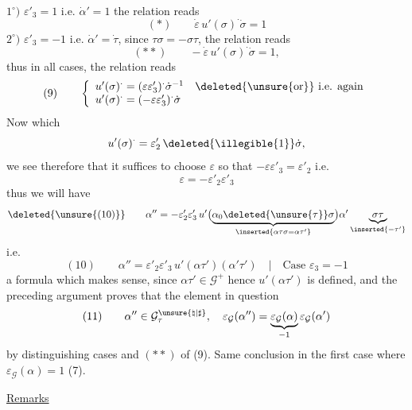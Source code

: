 $1^\circ)$ \quad $\varepsilon'_3=1$ i.e. $\dot{\alpha}'=1$
the relation reads
\[
(*)\qquad \dot{\varepsilon}\,u'(\sigma)^{\cdot}\dot{\sigma}=1
\]
$2^\circ)$ \quad $\varepsilon'_3=-1$ i.e. $\dot{\alpha}'=\dot{\tau}$,
since $\tau\sigma=-\sigma\tau$, the relation reads
\[
(**)\qquad -\dot{\varepsilon}\,u'(\sigma)^{\cdot}\dot{\sigma}=1,
\]
thus in all cases, the relation reads
\[
(9)\qquad
\left\{
\begin{array}{l}
u'(\sigma)^{\cdot}=(\varepsilon\varepsilon'_3)^{\cdot}
\dot{\sigma}^{-1}
\quad\deleted{\unsure{\text{or}}}\ \text{i.e. again}\\
u'(\sigma)^{\cdot}=(-\varepsilon\varepsilon'_3)^{\cdot}\dot{\sigma}
\end{array}
\right.
\]
Now 
which 
\[
u'(\sigma)^{\cdot}
=\varepsilon'_2\,\deleted{\text{\illegible{1}}}\dot{\sigma},
\]
we see therefore that it suffices to choose $\varepsilon$ so that
$-\varepsilon\varepsilon'_3=\varepsilon'_2$
i.e.
\[
\varepsilon=-\varepsilon'_2\varepsilon'_3
\]
thus we will have
\[
\deleted{\unsure{(10)}}\qquad
\alpha''=-\varepsilon'_2\varepsilon'_3\,
u'\bigl(
\underbrace{\alpha_0\deleted{\unsure{\tau}}\sigma}
_{\inserted{\alpha\tau\sigma=\alpha\tau'}}
\bigr)\alpha'\underbrace{\sigma\tau}_{\inserted{-\tau'}}
\]
i.e.
\[
(10)\qquad
\alpha''=\varepsilon'_2\varepsilon'_3\,u'(\alpha\tau')
(\alpha'\tau')
\quad\big|\quad\text{Case }\varepsilon_3=-1
\]
a formula which makes sense, since $\alpha\tau'\in\mathcal{G}^{+}$ hence
$u'(\alpha\tau')$ is defined, and the preceding argument proves that
the element in question 
\[
(11)\qquad
\alpha''\in\mathcal{G}^{\unsure{\natural|\sharp}}_\tau,\quad
\varepsilon_{\mathcal{G}}(\alpha'')
=\underbrace{\varepsilon_{\mathcal{G}}(\alpha)}_{-1}
\varepsilon_{\mathcal{G}}(\alpha')
\]
by distinguishing cases \unsure{(*)} and $(**)$ of (9).
Same conclusion in the first case where
$\varepsilon_{\mathcal{G}}(\alpha)=1$ (7).



\uline{Remarks} 

